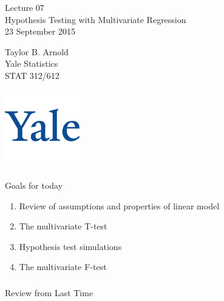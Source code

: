 



\begin{frame}[fragile] \frametitle{}

\vfill

{\fontsize{0.7cm}{0cm}\selectfont Lecture 07 \\\vspace{0.2cm}
Hypothesis Testing with Multivariate Regression}\\\vspace{0.5cm}
23 September 2015

\vspace{2cm}

\begin{minipage}{0.6\textwidth}
Taylor B. Arnold \\
Yale Statistics \\
STAT 312/612
\end{minipage}
\hfill
\begin{minipage}{0.3\textwidth}\raggedleft
\includegraphics[scale=0.3]{../yale-logo.png}
\end{minipage}%

\end{frame}

\begin{frame}[fragile] \frametitle{}

{\color{yaleblue}\fontsize{16pt}{20pt}\selectfont Goals for today}

\begin{enumerate}
\item Review of assumptions and properties of linear model
\item The multivariate T-test
\item Hypothesis test simulations
\item The multivariate F-test
\end{enumerate}

\end{frame}

\begin{frame}[fragile] \frametitle{}

\begin{flushright}
{\color{yaleblue}\sc\fontsize{1cm}{0cm}\selectfont Review from Last Time}
\end{flushright}

\end{frame}


